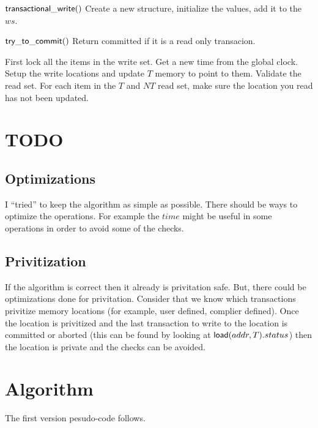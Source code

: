 \documentclass[11pt]{article}
\begin{document}
{\bf ${\sf transactional\_write}()$}
Create a new structure, initialize the values, add it to the $ws$.

{\bf ${\sf try\_to\_commit}()$}
Return committed if it is a read only transacion.

First lock all the items in the write set.
Get a new time from the global clock.
Setup the write locations and update $T$ memory to point to them.
Validate the read set.
For each item in the $T$ and $NT$ read set, make sure the location you read has not been updated.

\section{TODO}
\subsection{Optimizations}
I ``tried'' to keep the algorithm as simple as possible.
There should be ways to optimize the operations.
For example the $time$ might be useful in some operations
in order to avoid some of the checks.

\subsection{Privitization}
If the algorithm is correct then it already is privitation safe.
But, there could be optimizations done for privitation.
Consider that we know which transactions privitize memory locations (for example, user defined, complier defined).
Once the location is privitized and the last transaction to write to the location
is committed or aborted (this can be found by looking at ${\sf load}(addr, T).status$)
then the location is private and the checks can be avoided.

\section{Algorithm}
The first version pesudo-code follows.
\end{document}
